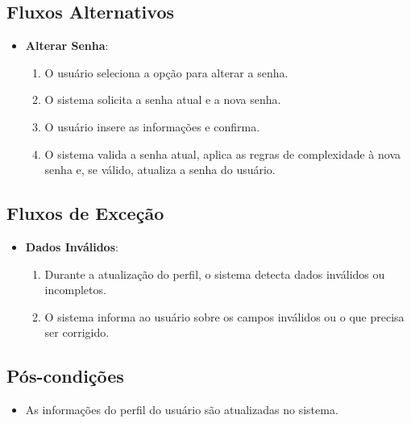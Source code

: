 \subsection*{Fluxos Alternativos}
\begin{addmargin}[1.5cm]{0cm}
	\begin{itemize}
		\item \textbf{Alterar Senha}:
		      \begin{enumerate}
			      \item O usuário seleciona a opção para alterar a senha.
			      \item O sistema solicita a senha atual e a nova senha.
			      \item O usuário insere as informações e confirma.
			      \item O sistema valida a senha atual, aplica as regras de complexidade à nova senha e, se válido, atualiza a senha do usuário.
		      \end{enumerate}
	\end{itemize}
\end{addmargin}

\subsection*{Fluxos de Exceção}
\begin{addmargin}[1.5cm]{0cm}
	\begin{itemize}
		\item \textbf{Dados Inválidos}:
		      \begin{enumerate}
			      \item Durante a atualização do perfil, o sistema detecta dados inválidos ou incompletos.
			      \item O sistema informa ao usuário sobre os campos inválidos ou o que precisa ser corrigido.
		      \end{enumerate}
	\end{itemize}
\end{addmargin}

\subsection*{Pós-condições}
\begin{addmargin}[1.5cm]{0cm}
	\begin{itemize}
		\item As informações do perfil do usuário são atualizadas no sistema.
	\end{itemize}
\end{addmargin}

